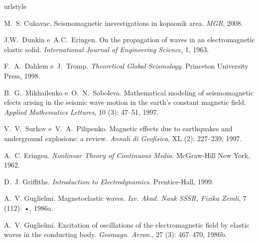 \documentclass[12pt,a4paper,openany]{abntex2}
\begin{document}
\tableofcontents










%

\begin{thebibliography}{25}
\providecommand{\natexlab}[1]{#1}
\providecommand{\url}[1]{\texttt{#1}}
\expandafter\ifx\csname urlstyle\endcsname\relax
  \providecommand{\doi}[1]{doi: #1}\else
  \providecommand{\doi}{doi: \begingroup \urlstyle{rm}\Url}\fi


M.~S. Cukavac.
\newblock Seismomagnetic insvestigations in kopaonik area.
\newblock \emph{MGB}, 2008.

J.W.~Dunkin e~A.C.~Eringen.
\newblock On the propagation of waves in an electromagnetic elastic solid.
\newblock \emph{International Journal of Engineering Science}, 1, 1963.


F.~A.~Dahlem e~J.~Tromp.
\newblock \emph{Theoretical Global Seismology}.
\newblock Princeton University Press, 1998.

B.~G.~Mikhailenko e~O.~N.~Soboleva.
\newblock Mathematical modeling of seismomagnetic efects arising in the seismic
  wave motion in the earth's constant magnetic field.
\newblock \emph{Applied Mathematics Lettures}, 10 (3):
  47--51, 1997.

V.~V.~Surkov e~V.~A.~Pilipenko.
\newblock Magnetic effects due to earthquakes and underground explosions: a
  review.
\newblock \emph{Annali di Geofisica}, XL (2): 227--239, 1997.

A.~C. Eringen.
\newblock \emph{Nonlinear Theory of Continuous Media}.
\newblock McGraw-Hill New York, 1962.

D.~J. Griffiths.
\newblock \emph{Introduction to Electrodynamics}.
\newblock Prentice-Hall, 1999.

A.~V. Guglielmi.
\newblock Magnetoelastic waves.
\newblock \emph{Izv. Akad. Nauk SSSR, Fizika Zemli}, 7 (112):
  •, 1986a.

A.~V. Guglielmi.
\newblock Excitation of oscillations of the electromagnetic field by elastic
  waves in the conducting body.
\newblock \emph{Geomagn. Aeron.}, 27 (3): 467--470, 1986b.


\end{thebibliography}
\end{document}
